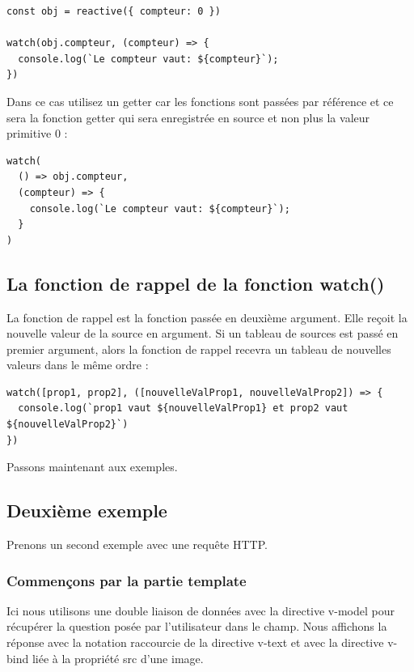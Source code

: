 \documentclass{article}
\begin{document}
\begin{verbatim}
const obj = reactive({ compteur: 0 })

watch(obj.compteur, (compteur) => {
  console.log(`Le compteur vaut: ${compteur}`);
})
\end{verbatim}
Dans ce cas utilisez un getter car les fonctions sont passées par référence et ce sera la fonction getter qui sera enregistrée en source et non plus la valeur primitive 0 :
\begin{verbatim}
watch(
  () => obj.compteur,
  (compteur) => {
    console.log(`Le compteur vaut: ${compteur}`);
  }
)
\end{verbatim}
\subsection{La fonction de rappel de la fonction {\color{monOrange}watch()}}
La fonction de rappel est la fonction passée en deuxième argument. Elle reçoit la nouvelle valeur de la source en argument. Si un tableau de sources est passé en premier argument, alors la fonction de rappel recevra un tableau de nouvelles valeurs dans le même ordre :
\begin{verbatim}
watch([prop1, prop2], ([nouvelleValProp1, nouvelleValProp2]) => {
  console.log(`prop1 vaut ${nouvelleValProp1} et prop2 vaut ${nouvelleValProp2}`)
})
\end{verbatim}
Passons maintenant aux exemples.



\subsection{Deuxième exemple}
Prenons un second exemple avec une requête HTTP.

\subsubsection{Commençons par la partie {\color{monOrange}template}}
Ici nous utilisons une double liaison de données avec la directive {\color{monOrange}v-model} pour récupérer la question posée par l'utilisateur dans le champ. Nous affichons la réponse avec la notation raccourcie de la directive v-text et avec la directive {\color{monOrange}v-bind} liée à la propriété {\color{monOrange}src} d'une image.
\end{document}
